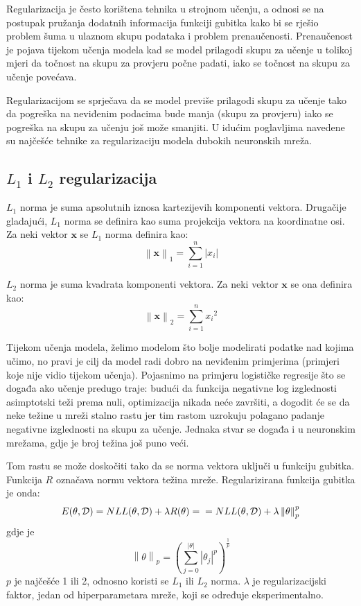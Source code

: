 \documentclass[times, utf8, diplomski, numeric]{fer}
\newcommand{\norm}[1]{\left\lVert#1\right\rVert}
\newcommand{\abs}[1]{\left\lvert#1\right\rvert}
\begin{document}
Regularizacija je često korištena tehnika u strojnom učenju, a odnosi se na postupak pružanja dodatnih informacija funkciji gubitka kako bi se rješio problem šuma u ulaznom skupu podataka i problem prenaučenosti. Prenaučenost je pojava tijekom učenja modela kad se model prilagodi skupu za učenje u tolikoj mjeri da točnost na skupu za provjeru  počne padati, iako se točnost na skupu za učenje povećava.

Regularizacijom se sprječava da se model previše prilagodi skupu za učenje tako da pogreška na neviđenim podacima bude manja (skupu za provjeru) iako se pogreška na skupu za učenju još može smanjiti. U idućim poglavljima navedene su najčešće tehnike za regularizaciju modela dubokih neuronskih mreža.

\subsection{$L_1$ i $L_2$ regularizacija}

$L_1$ norma je suma apsolutnih iznosa kartezijevih komponenti vektora. Drugačije gladajući, $L_1$ norma se definira kao suma projekcija vektora na koordinatne osi. Za neki vektor $\boldsymbol{x}$ se $L_1$ norma definira kao:
\begin{equation}
\norm{\boldsymbol{x}}_1 = \sum_{i = 1}^{n} \abs{x_i}
\end{equation}

$L_2$ norma je suma kvadrata komponenti vektora. Za neki vektor $\boldsymbol{x}$ se ona definira kao:
\begin{equation}
\norm{\boldsymbol{x}}_2 = \sum_{i = 1}^{n} {x_i}^2
\end{equation}

Tijekom učenja modela, želimo modelom što bolje modelirati podatke nad kojima učimo, no pravi je cilj da model radi dobro na neviđenim primjerima (primjeri koje nije vidio tijekom učenja). Pojasnimo na primjeru logističke regresije što se događa ako učenje predugo traje: budući da funkcija negativne log izglednosti asimptotski teži prema nuli, optimizacija nikada neće završiti, a dogodit će se da neke težine u mreži stalno rastu jer tim rastom uzrokuju polagano padanje negativne izglednosti na skupu za učenje. Jednaka stvar se događa i u neuronskim mrežama, gdje je broj težina još puno veći.

Tom rastu se može doskočiti tako da se norma vektora uključi u funkciju gubitka. Funkcija $R$ označava normu vektora težina mreže. Regularizirana funkcija gubitka je onda:
\begin{equation}
    E(\theta, \mathcal{D}) = NLL(\theta, \mathcal{D}) + \lambda R(\theta) = \\
    = NLL(\theta, \mathcal{D}) + \lambda \norm{\theta}_p^p
\end{equation}
gdje je
\begin{equation}
    \norm{\theta}_p = (\sum_{j = 0}^{\abs{\theta}} \abs{\theta_j}^p)^{\frac{1}{p}}
\end{equation}
$p$ je najčešće 1 ili 2, odnosno koristi se $L_1$ ili $L_2$ norma. $\lambda$ je regularizacijski faktor, jedan od hiperparametara mreže, koji se određuje eksperimentalno.
\end{document}
